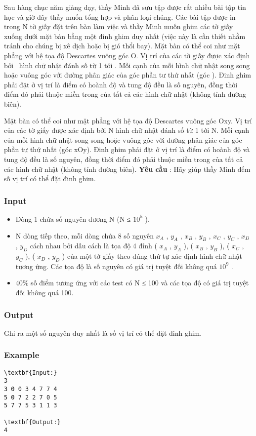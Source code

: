 



   Sau hàng chục năm giảng dạy, thầy Minh đã sưu tập được rất nhiều bài tập tin học và giờ đây thầy muốn tổng hợp và phân loại chúng. Các bài tập được in trong N tờ giấy đặt trên bàn làm việc và thầy Minh muốn ghim các tờ giấy xuống dưới mặt bàn bằng một đinh ghim duy nhất (việc này là cần thiết nhằm tránh cho chúng bị xê dịch hoặc bị gió thổi bay).       Mặt bàn có thể coi như mặt phẳng với hệ tọa độ Descartes vuông góc Ο. Vị trí của các tờ giấy được xác định bởi  hình chữ nhật đánh số từ 1 tới . Mỗi cạnh của mỗi hình chữ nhật song song hoặc vuông góc với đường phân giác của góc phần tư thứ nhất (góc ). Đinh ghim phải đặt ở vị trí là điểm có hoành độ và tung độ đều là số nguyên, đồng thời điểm đó phải thuộc miền trong của tất cả các hình chữ nhật (không tính đường biên).    

   Mặt bàn có thể coi như mặt phẳng với hệ tọa độ Descartes vuông góc Οxy. Vị trí của các tờ giấy được xác định bởi N hình chữ nhật đánh số từ 1 tới N. Mỗi cạnh của mỗi hình chữ nhật song song hoặc vuông góc với đường phân giác của góc phần tư thứ nhất (góc xOy). Đinh ghim phải đặt ở vị trí là điểm có hoành độ và tung độ đều là số nguyên, đồng thời điểm đó phải thuộc miền trong của tất cả các hình chữ nhật (không tính đường biên).  \textbf{    Yêu cầu   }   : Hãy giúp thầy Minh đếm số vị trí có thể đặt đinh ghim.    

\subsubsection{   Input  }
\begin{itemize}
	\item     Dòng 1 chứa số nguyên dương N (N ≤ $10^{5}$    ).   
	\item     N dòng tiếp theo, mỗi dòng chứa 8 số nguyên $x_{A}$    , $y_{A}$    , $x_{B}$    , $y_{B}$    , $x_{C}$    , $y_{C}$    , $x_{D}$    , $y_{D}$    cách nhau bởi dấu cách là tọa độ 4 đỉnh (         $x_{A}$     , $y_{A}$     ), (           $x_{B}$      , $y_{B}$     ), (           $x_{C}$      , $y_{C}$     ), (           $x_{D}$      , $y_{D}$     ) của một tờ giấy theo đúng thứ tự xác định hình chữ nhật tương ứng. Các tọa độ là số nguyên có giá trị tuyệt đối không quá $10^{9}$     .    
	\item      40\% số điểm tương ứng với các test có N         ≤ 100 và các tọa độ có giá trị tuyệt đối không quá 100.    
\end{itemize}

\subsubsection{   Output  }

   Ghi ra một số nguyên duy nhất là số vị trí có thể đặt đinh ghim.  

\subsubsection{   Example  }
\begin{verbatim}
\textbf{Input:}
3
3 0 0 3 4 7 7 4 
5 0 7 2 2 7 0 5 
5 7 7 5 3 1 1 3

\textbf{Output:}
4\end{verbatim}
